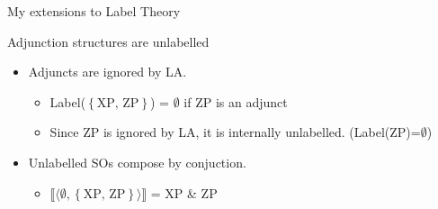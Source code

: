 \documentclass[Proposal]{subfiles}
\begin{document}
\begin{frame}
  {My extensions to Label Theory}
  \begin{block}
    {Adjunction structures are unlabelled}
    \begin{itemize}
      \item Adjuncts are ignored by LA.
	\begin{itemize}
	  \item Label($\left\{ \text{XP, ZP} \right\}$) = $\emptyset$ if ZP is an adjunct
	  \item Since ZP is ignored by LA, it is internally unlabelled. (Label(ZP)=$\emptyset$)
	\end{itemize}
	\pause
      \item Unlabelled SOs compose by conjuction.
	\begin{itemize}
	  \item $\llbracket\langle \emptyset, \left\{ \text{XP, ZP} \right\}\rangle\rrbracket$ = XP \& ZP 
	\end{itemize}
    \end{itemize}
  \end{block}
\end{frame}

\end{document}
